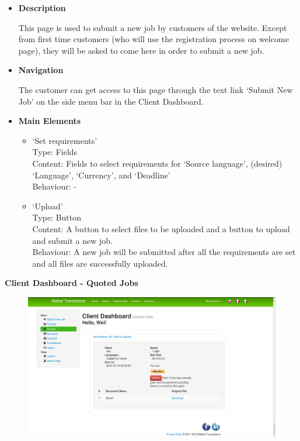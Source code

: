 \documentclass{l3proj}
\begin{document}
\begin{itemize}
\item \textbf{Description}

This page is used to submit a new job by customers of the website. Except from first time customers (who will use the registration process on welcome page), 
they will be asked to come here in order to submit a new job.

\item \textbf{Navigation}

The customer can get access to this page through the text link `Submit New Job' on the side menu bar in the Client Dashboard.

\item \textbf{Main Elements}
\begin{itemize}

\item `Set requirements'\\
Type: Fields\\
Content: Fields to select requirements for `Source language', (desired) `Language', `Currency', and `Deadline' \\
Behaviour: - \\

\item `Upload'\\
Type: Button\\
Content: A  button to select files to be uploaded and a button to upload and submit a new job.\\
Behaviour: A new job will be submitted after all the requirements are set and all files are successfully uploaded.\\

\end{itemize}
\end{itemize}


\textbf{Client Dashboard - Quoted Jobs}
\begin{figure}[H]
\centering
\includegraphics[width=0.8\linewidth]{images/clientDashQuoted}
\vspace{-30pt}
\end{figure}
\end{document}
